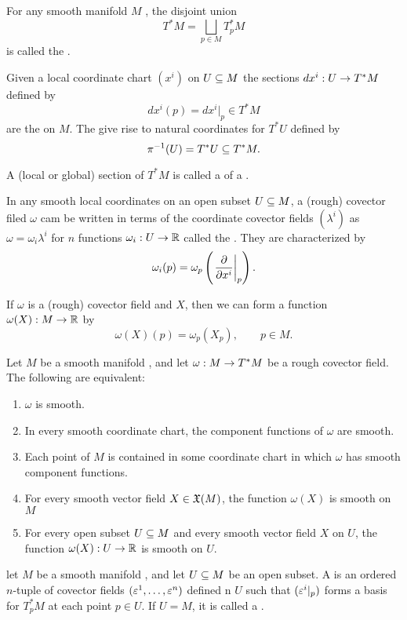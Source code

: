 \dfn For any smooth manifold $M$ \wowob, the disjoint union
\[T^*M = \bigsqcup_{p\in M} T^*_pM\]
is called the .

\dfn Given a local coordinate chart $(x^i)$ on $U\subseteq M$ the sections $dx^i:U\rightarrow T^*M$ defined by 
\[dx^i(p) = dx^i|_p\in T^*M\]
are the  on $M$. The give rise to natural coordinates for $T^*U$ defined by 
\[\pi^{-1}(U) = T^*U\subseteq T^*M.\]

\dfn A (local or global) section of $T^*M$ is called a  of a .

\dfn In any smooth local coordinates on an open subset $U\subseteq M$, a (rough) covector filed $\omega$ cam be written in terms of the coordinate covector fields $(\lambda^i)$ as $\omega = \omega_i\lambda^i$ for $n$ functions $\omega_i:U\rightarrow \mathbb{R}$ called the . They are characterized by 
\[\omega_i(p) = \omega_p\left(\left. \frac{\partial}{\partial x^i}\right|_{p}\right).\]

\nb If $\omega$ is a (rough) covector field and $X$, then we can form a function $\omega(X):M\rightarrow \mathbb{R}$ by
\[\omega(X)(p) = \omega_p(X_p),\qquad p\in M.\]

\begin{prop}
Let $M$ be a smooth manifold \wowob, and let $\omega:M\rightarrow T^*M$ be a rough covector field. The following are equivalent:
\begin{enumerate}
    \item $\omega$ is smooth.
    \item In every smooth coordinate chart, the component functions of $\omega$ are smooth.
    \item Each point of $M$ is contained in some coordinate chart in which $\omega$ has smooth component functions.
    \item For every smooth vector field $X\in \mathfrak{X}(M)$, the function $\omega(X)$ is smooth on $M$
    \item For every open subset $U\subseteq M$ and every smooth vector field $X$ on $U$, the function $\omega(X):U\rightarrow \mathbb{R}$ is smooth on $U$.
\end{enumerate}
\end{prop}

\dfn let $M$ be a smooth manifold \wowob, and let $U\subseteq M$ be an open subset. A  is an ordered $n$-tuple of covector fields $(\varepsilon^1,\ldots,\varepsilon^n)$ defined n $U$ such that $(\varepsilon^i|_p)$ forms a basis for $T^*_pM$ at each point $p\in U$. If $U = M$, it is called a .

